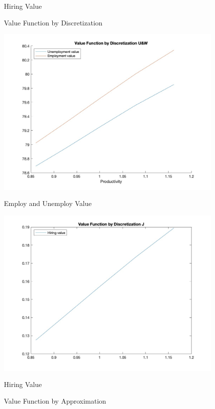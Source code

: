 \documentclass[10pt]{article} %
\begin{document}
\begin{figure}
\begin{minipage}{.5\textwidth}
              \caption{Hiring Value}
            \end{minipage}
            \caption{Value Function by Discretization}
            \label{ValueDiscretization}
        \end{figure}

        \begin{figure}
            \centering
            \begin{minipage}{.5\textwidth}
                \centering
                \includegraphics[width=\linewidth]{ValueUWApproximation}
                \caption{Employ and Unemploy Value}
            \end{minipage}%
            \begin{minipage}{.5\textwidth}
                \centering
                \includegraphics[width=\linewidth]{ValueJApproximation}
                \caption{Hiring Value}
            \end{minipage}
            \caption{Value Function by Approximation}
            \label{ValueApproximation}
        \end{figure}
\end{document}
